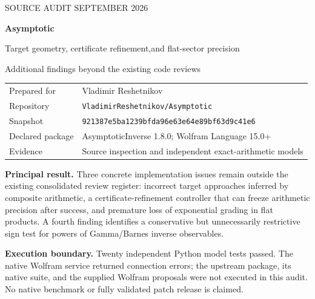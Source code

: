 \documentclass[11pt,letterpaper]{article}
\newcommand{\code}[1]{\nolinkurl{#1}}
\newcommand{\sha}{\nolinkurl{921387e5ba1239bfda96e63e64e89bf63d9c41e6}}
\begin{document}
\hypersetup{pageanchor=false}
\begin{titlepage}
\vspace*{0.6in}
{\small\textcolor{muted}{SOURCE AUDIT  SEPTEMBER 2026}}\par
\vspace{0.4in}
{\Huge\bfseries Asymptotic}\par
\vspace{0.18in}
{\LARGE Target geometry, certificate refinement,\newline and flat-sector precision}\par
\vspace{0.3in}
{\large Additional findings beyond the existing code reviews}\par
\vspace{0.7in}
\begin{tabular}{@{}ll}
Prepared for & Vladimir Reshetnikov\\[0.5em]
Repository & \code{VladimirReshetnikov/Asymptotic}\\[0.5em]
Snapshot & \sha\\[0.5em]
Declared package & AsymptoticInverse 1.8.0; Wolfram Language 15.0+\\[0.5em]
Evidence & Source inspection and independent exact-arithmetic models
\end{tabular}
\vfill
\begin{minipage}{0.94\textwidth}
\textbf{Principal result.} Three concrete implementation issues remain outside the existing consolidated review register: incorrect target approaches inferred by composite arithmetic, a certificate-refinement controller that can freeze arithmetic precision after success, and premature loss of exponential grading in flat products. A fourth finding identifies a conservative but unnecessarily restrictive sign test for powers of Gamma/Barnes inverse observables.

\textbf{Execution boundary.} Twenty independent Python model tests passed. The native Wolfram service returned connection errors; the upstream package, its native suite, and the supplied Wolfram proposals were not executed in this audit. No native benchmark or fully validated patch release is claimed.
\end{minipage}
\end{titlepage}
\hypersetup{pageanchor=true}
\tableofcontents
\newpage
{}






\clearpage

\end{document}
